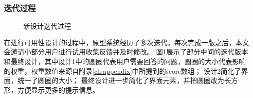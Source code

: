 \subsubsection{迭代过程}
\begin{figure}[h]
    \centering
    \caption{新设计迭代过程}
    \label{fig:diag_new}
\end{figure}
在进行可用性设计的过程中，原型系统经历了多次迭代。每次完成一版之后，本文会邀请小部分用户进行试用收集反馈并及时修改。
图\ref{fig:diag_new}展示了部分中间的迭代版本和最终设计，其中设计1中的圆圈代表用户需要回答的问题，圆圈的大小代表影响的权重，权重数值来源自附录\ref{ch:appendix}中所提到的score数组；
设计2简化了界面，统一了圆圈的大小；
最终设计进一步简化了界面元素，并把圆圈改为长方形，方便显示更多的提示信息。

